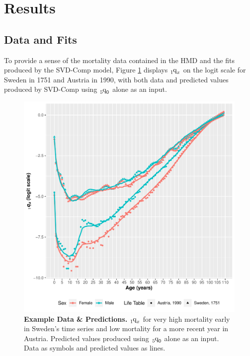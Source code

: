 \documentclass[11pt]{article}
\newcommand{\qf}{\tensor*[_5]{\mbox{q}}{_0}}
\newcommand{\qox}{\tensor*[_{1}]{\mbox{q}}{_{x}}}
\begin{document}
\section{Results} \label{sec:results}

\subsection{Data and Fits}

To provide a sense of the mortality data contained in the HMD and the fits produced by the SVD-Comp model, Figure \ref{fig:data} displays $\qox$ on the logit scale for Sweden in 1751 and Austria in 1990, with both data and predicted values produced by SVD-Comp using $\qf$ alone as an input.

\begin{figure}[htbp]
   \centering
   \includegraphics[width=\linewidth]{../figures/fig1.pdf} 
   \captionsetup{format=plain,font=normalsize,margin=0cm,justification=justified}
   \caption{\textbf{Example Data \& Predictions.}  $\qox$ for very high mortality early in Sweden's time series and low mortality for a more recent year in Austria.  Predicted values produced using $\qf$ alone as an input.  Data as symbols and predicted values as lines.}
   \label{fig:data}
\end{figure}
\end{document}
